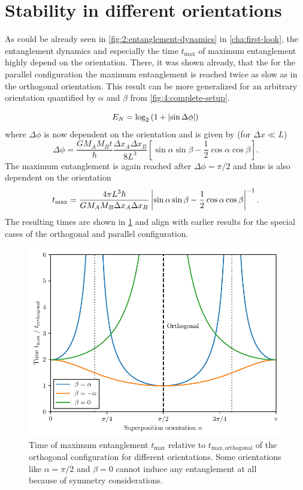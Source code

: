 \section{Stability in different orientations}\label{sec:4:orientation}
As could be already seen in \cref{fig:2:entanglement-dynamics} in \cref{cha:first-look}, the entanglement dynamics and especially the time $t_\mathrm{max}$ of maximum entanglement highly depend on the orientation.
There, it was shown already, that the for the parallel configuration the maximum entanglement is reached twice as slow as in the orthogonal orientation.
This result can be more generalized for an arbitrary orientation quantified by $\alpha$ and $\beta$ from \cref{fig:4:complete-setup}.


\begin{equation}
  E_N = \log_2\left(1 + \left\lvert\sin\Delta \phi\right\rvert\right)
\end{equation}
where $\Delta \phi$ is now dependent on the orientation and is given by (for $\Delta x \ll L$)
\begin{equation}
  \Delta \phi = \frac{G M_A M_B t}{\hbar}\frac{\Delta x_A \Delta x_B}{8 L^3} \left[\sin\alpha\sin\beta - \frac{1}{2}\cos\alpha\cos\beta\right] .
\end{equation}
The maximum entanglement is again reached after $\Delta\phi = \pi/2$ and thus is also dependent on the orientation
\begin{equation}\label{eq:4:t-max}
  t_\mathrm{max} = \frac{4\pi L^3\hbar}{GM_AM_B\Delta x_A \Delta x_B} \left\lvert\sin\alpha\sin\beta - \frac{1}{2}\cos\alpha\cos\beta\right\rvert^{-1}.
\end{equation}
The resulting times are shown in \cref{fig:4:t-max-orientation} and align with earlier results for the special cases of the orthogonal and parallel configuration.
\begin{figure}[!htbp]
  \centering
  \includegraphics[width=\textwidth]{./../figures/ideal-entanglement/EN-orientation.pdf}
  \caption{Time of maximum entanglement $t_\mathrm{max}$ relative to $t_\mathrm{max,orthogonal}$ of the orthogonal configuration for different orientations. Some orientations like $\alpha=\pi/2$ and $\beta=0$ cannot induce any entanglement at all because of symmetry considerations.}
  \label{fig:4:t-max-orientation}
\end{figure}
